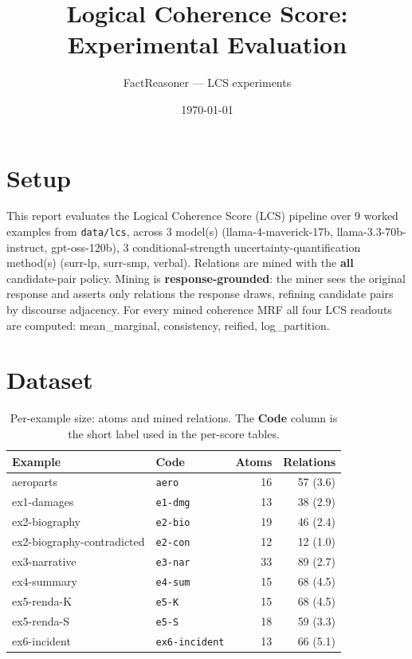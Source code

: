 \documentclass[11pt]{article}
\title{Logical Coherence Score: Experimental Evaluation}
\author{FactReasoner --- LCS experiments}
\date{\today}
\begin{document}
\maketitle

\section{Setup}

This report evaluates the Logical Coherence Score (LCS) pipeline over 9 worked examples from \texttt{data/lcs}, across 3 model(s) (llama-4-maverick-17b, llama-3.3-70b-instruct, gpt-oss-120b), 3 conditional-strength uncertainty-quantification method(s) (surr-lp, surr-smp, verbal). Relations are mined with the \textbf{all} candidate-pair policy. Mining is \textbf{response-grounded}: the miner sees the original response and asserts only relations the response draws, refining candidate pairs by discourse adjacency. For every mined coherence MRF all four LCS readouts are computed: mean\_marginal, consistency, reified, log\_partition. 

\section{Dataset}

\begin{table}[htbp]
\centering
\small
\caption{Per-example size: atoms and mined relations. The \textbf{Code} column is the short label used in the per-score tables.}
\label{tab:coverage}
\begin{tabular}{llrr}
\toprule
Example & Code & Atoms & Relations \\
\midrule
aeroparts & \texttt{aero} & 16 & 57 (3.6) \\
ex1-damages & \texttt{e1-dmg} & 13 & 38 (2.9) \\
ex2-biography & \texttt{e2-bio} & 19 & 46 (2.4) \\
ex2-biography-contradicted & \texttt{e2-con} & 12 & 12 (1.0) \\
ex3-narrative & \texttt{e3-nar} & 33 & 89 (2.7) \\
ex4-summary & \texttt{e4-sum} & 15 & 68 (4.5) \\
ex5-renda-K & \texttt{e5-K} & 15 & 68 (4.5) \\
ex5-renda-S & \texttt{e5-S} & 18 & 59 (3.3) \\
ex6-incident & \texttt{ex6-incident} & 13 & 66 (5.1) \\
\bottomrule
\end{tabular}
\end{table}
\end{document}
